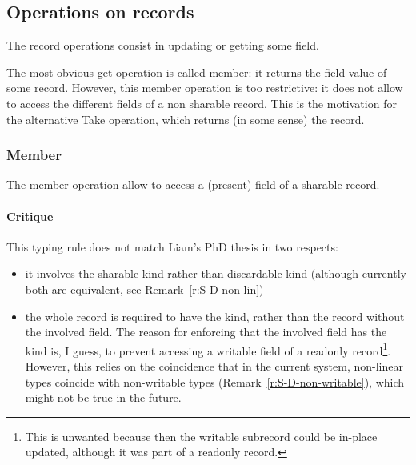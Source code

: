 \documentclass{article}
\begin{document}

\subsection{Operations on records}
The record operations consist in updating or getting some field.

The most obvious get operation is called member: it returns the field value
of some record. However, this member operation is too restrictive: 
it does not allow to access the different fields of a non sharable record.
This is the motivation for the alternative Take operation,
which returns (in some sense) the record.
\subsubsection{Member}
The member operation allow to
access a (present) field
of a
sharable record.

\paragraph{Critique} This typing rule does not match Liam's PhD thesis in two
respects:
\begin{itemize}
\item it involves the sharable kind rather than discardable kind (although currently
  both are equivalent, see Remark~\ref{r:S-D-non-lin})
  \item the whole record is required to have the kind, rather than the record
    without the involved field.
    The reason for enforcing that the involved field has the kind
    is, I guess, to prevent accessing a writable field of a readonly
    record\footnote{This is unwanted because then the writable subrecord could
      be in-place updated, although it was part of a readonly record.}. However, this
    relies on the coincidence that in the current system, non-linear types
    coincide with non-writable types (Remark~\ref{r:S-D-non-writable}), which
    might not be true in the future.
\end{itemize}
\end{document}
